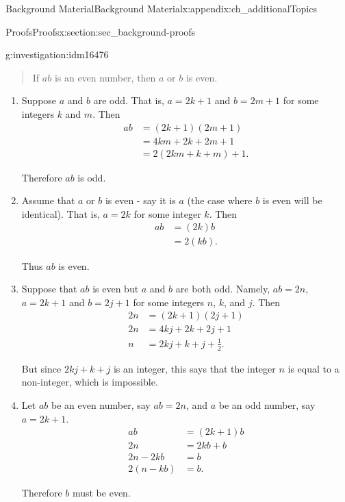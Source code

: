 \documentclass[oneside,10pt,]{book}
\numberwithin{equation}{chapter}
\newcommand{\amp}{&}
\begin{document}
\begin{appendixptx}{Background Material}{}{Background Material}{}{}{x:appendix:ch_additionalTopics}
\begin{sectionptx}{Proofs}{}{Proofs}{}{}{x:section:sec_background-proofs}
\begin{introduction}{}
\begin{investigation}{}{g:investigation:idm16476}
\begin{quote}
If \(a b\) is an even number, then \(a\) or \(b\) is even.%
\end{quote}
%
\begin{enumerate}
\item{}Suppose \(a\) and \(b\) are odd. That is, \(a=2k+1\) and \(b=2m+1\) for some integers \(k\) and \(m\). Then%
\begin{align*}
ab \amp =(2k+1)(2m+1)\\
\amp =4km+2k+2m+1\\
\amp =2(2km+k+m)+1.
\end{align*}
%
\par
Therefore \(ab\) is odd.%
\item{}Assume that \(a\) or \(b\) is even - say it is \(a\) (the case where \(b\) is even will be identical). That is, \(a=2k\) for some integer \(k\). Then%
\begin{align*}
ab \amp =(2k)b\\
\amp =2(kb).
\end{align*}
%
\par
Thus \(ab\) is even.%
\item{}Suppose that \(ab\) is even but \(a\) and \(b\) are both odd. Namely, \(ab = 2n\), \(a=2k+1\) and \(b=2j+1\) for some integers \(n\), \(k\), and \(j\). Then%
\begin{align*}
2n \amp =(2k+1)(2j+1)\\
2n \amp =4kj+2k+2j+1\\
n \amp = 2kj+k+j+\frac{1}{2}.
\end{align*}
%
\par
But since \(2kj+k+j\) is an integer, this says that the integer \(n\) is equal to a non-integer, which is impossible.%
\item{}Let \(ab\) be an even number, say \(ab=2n\), and \(a\) be an odd number, say \(a=2k+1\).%
\begin{align*}
ab \amp =(2k+1)b\\
2n \amp =2kb+b\\
2n-2kb\amp =b\\
2(n-kb)\amp =b.
\end{align*}
%
\par
Therefore \(b\) must be even.%
\end{enumerate}
%
\end{investigation}

\end{introduction}
\end{sectionptx}
\end{appendixptx}
\end{document}
